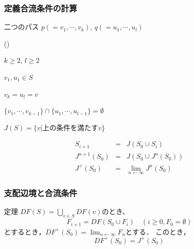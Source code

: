 \documentclass[dvipdfmx]{beamer}
\newcounter{coffee}
\begin{document}
\begin{frame}
  \frametitle{定義合流条件の計算}

  \begin{list}{}{}
    \item [定義合流条件($\mathscr{S}$)]
          二つのパス $p(=v_1,\cdots,v_k)$, $q(=u_1,\cdots,u_l)$
          \begin{list}{()}{}
            \item $k\ge 2$, $l\ge 2$
            \item $v_1,u_1\in S$
            \item $v_k=u_l=v$
            \item $\{v_1,\cdots,v_{k-1}\}\cap\{u_1,\cdots,u_{l-1}\}=\emptyset$
          \end{list}

          \vspace*{5pt}

    \item $J(S)=\{v|\mbox{上の条件を満たす$v$}\}$
  \end{list}

  \vspace*{5pt}


  \vspace*{5pt}

  {\small{}}

  \[
    \begin{array}{rcl}
      S_{i+1}      & = & J(S_0\cup S_i)                   \\
      J^{n+1}(S_0) & = & J(S_0\cup J^n(S_0))              \\
      J^+(S_0)     & = & \lim_{n\leftarrow\infty}J^n(S_0)
    \end{array}
  \]

\end{frame}

\begin{frame}
  \frametitle{支配辺境と合流条件}

  \begin{itembox}[l]{定理}
    $DF(S)=\bigcup_{v\in S}DF(v)$のとき、
    \[
      F_{i+1}=DF(S_0\cup F_i)\quad(i\ge 0,F_0=\emptyset)
    \]
    とするとき，$DF^+(S_0)=\lim_{n\leftarrow\infty}F_n$とする．
    このとき，
    \[
      DF^+(S_0)=J^+(S_0)
    \]
  \end{itembox}


\end{frame}
\end{document}
